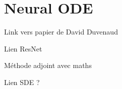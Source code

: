 \chapter{Neural ODE}\label{sec:Neural Ordinary Differential Equation}

Link vers papier de David Duvenaud

Lien ResNet

Méthode adjoint avec maths

Lien SDE ?